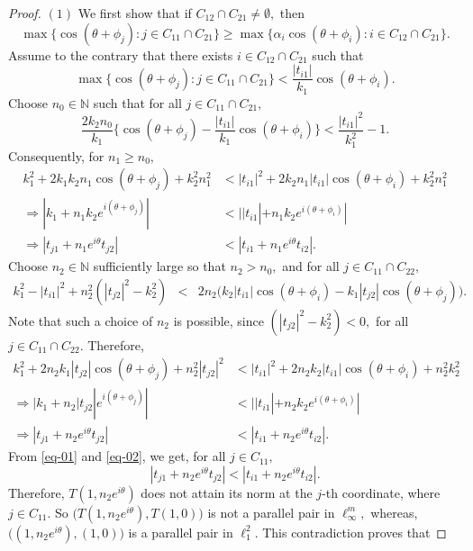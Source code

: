 \documentclass[10pt,a4paper]{amsart}
\begin{document}
\begin{proof}
	
$(1)$  We first show that if $C_{12}\cap C_{21}\neq \emptyset,$ then $$\max\{\cos(\theta+\phi_j):j\in C_{11}\cap C_{21} \}
\geq \max\Big\{\alpha_i\cos(\theta+\phi_i): i\in C_{12}\cap C_{21}\Big\}.$$ 
Assume to the contrary that there exists $i\in C_{12}\cap C_{21}$ such that 
\[\max\{\cos(\theta+\phi_j):j\in C_{11}\cap C_{21} \}<\frac{|t_{i1}|}{k_1}\cos(\theta+\phi_i).\]	
Choose $n_0\in \mathbb{N}$ such that for all $j\in C_{11}\cap C_{21},$
\[\frac{2k_2n_0}{k_1}\Big\{\cos(\theta+\phi_j)-\frac{|t_{i1}|}{k_1}\cos(\theta+\phi_i)\Big\}<\frac{|t_{i1}|^2}{k_1^2}-1.\]
Consequently, for  $n_1\geq n_0,$
\begin{equation}\label{eq-01}
	\begin{aligned}
k_1^2+2k_1k_2n_1\cos(\theta+\phi_j)+k_2^2n_1^2&<|t_{i1}|^2+2	k_2n_1|t_{i1}|\cos(\theta+\phi_i)+k_2^2n_1^2\\
\Rightarrow|k_1+n_1k_2e^{i(\theta+\phi_j)}|&<||t_{i1}|+n_1k_2e^{i(\theta+\phi_i)}|\\
\Rightarrow|t_{j1}+n_1e^{i\theta}t_{j2}|&<|t_{i1}+n_1e^{i\theta}t_{i2}|.
\end{aligned}
\end{equation}
Choose 
$n_2\in \mathbb{N}$ sufficiently large so that $n_2>n_0,$ and for all $j\in C_{11}\cap C_{22},$
\begin{eqnarray*}
k_1^2-|t_{i1}|^2+n_2^2(|t_{j2}|^2-k_2^2)&<& 2n_2\Big(k_2	|t_{i1}|\cos(\theta+\phi_i)-k_1|t_{j2}|\cos(\theta+\phi_j)\Big).
\end{eqnarray*}
Note that such a choice of $n_2$ is possible, since $(|t_{j2}|^2-k_2^2)<0,$ for all $j\in C_{11}\cap C_{22}.$ Therefore, 
\begin{equation}\label{eq-02}
		\begin{split}
	k_1^2+2n_2k_1|t_{j2}|\cos(\theta+\phi_j)+n_2^2|t_{j2}|^2&< |t_{i1}|^2+2n_2k_2	|t_{i1}|\cos(\theta+\phi_i)+n_2^2k_2^2\\
	\Rightarrow |k_1+n_2|t_{j2}|e^{i(\theta+\phi_j)}|&<||t_{i1}|+n_2k_2e^{i(\theta+\phi_i)}|\\
	\Rightarrow|t_{j1}+n_2e^{i\theta}t_{j2}|&<|t_{i1}+n_2e^{i\theta}t_{i2}|.
	\end{split}
\end{equation}
From \eqref{eq-01} and \eqref{eq-02}, we get, for all $j\in C_{11},$
\[|t_{j1}+n_2e^{i\theta}t_{j2}|<|t_{i1}+n_2e^{i\theta}t_{i2}|.\]
Therefore, $T(1,n_2e^{i\theta})$ does not attain its norm at the $j$-th coordinate, where $j\in C_{11}.$  So $\Big(T(1,n_2e^{i\theta}),T(1,0)\Big)$ is not a parallel pair in $\ell_\infty^m,$ whereas, $\Big((1,n_2e^{i\theta}),(1,0)\Big)$ is a parallel pair in $\ell_1^2.$ This contradiction proves that 

\end{proof}
\end{document}
